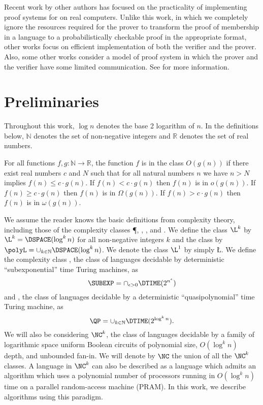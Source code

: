 \documentclass{article}
\begin{document}
Recent work by other authors has focused on the practicality of implementing proof systems for \NP{} on real computers.
Unlike this work, in which we completely ignore the resources required for the prover to transform the proof of membership in a language to a probabilistically checkable proof in the appropriate format, other works focus on efficient implementation of both the verifier and the prover.
Also, some other works consider a model of proof system in which the prover and the verifier have some limited communication.
See \autocites{bcgt13}{smbw12}{svpbbw12}{trmp12}{gkr08} for more information.

\section{Preliminaries}

Throughout this work, $\log n$ denotes the base 2 logarithm of $n$.
In the definitions below, $\mathbb{N}$ denotes the set of non-negative integers and $\mathbb{R}$ denotes the set of real numbers.

\begin{definition}
  For all functions $f, g \colon \mathbb{N} \to \mathbb{R}$, the function $f$ is in the class $O(g(n))$ if there exist real numbers $c$ and $N$ such that for all natural numbers $n$ we have $n > N$ implies $f(n) \leq c \cdot g(n)$.
  If $f(n) < c \cdot g(n)$ then $f(n)$ is in $o(g(n))$.
  If $f(n) \geq c \cdot g(n)$ then $f(n)$ is in $\Omega(g(n))$.
  If $f(n) > c \cdot g(n)$ then $f(n)$ is in $\omega(g(n))$.
\end{definition}

We assume the reader knows the basic definitions from complexity theory, including those of the complexity classes \P, \NP, \DTIME, and \DSPACE{}.
We define the class $\L^k$ by $\L^k = \DSPACE(\log^k n)$ for all non-negative integers $k$ and the class \polyL{} by $\polyL = \cup_{k \in \mathbb{N}} \DSPACE(\log^k n)$.
We denote the class $\L^1$ by simply \L.
We define the complexity class \SUBEXP{}, the class of languages decidable by deterministic ``subexponential'' time Turing machines, as
\begin{equation*}
  \SUBEXP = \cap_{\epsilon > 0} \DTIME(2^{n^\epsilon})
\end{equation*}
and \QP{}, the class of languages decidable by a deterministic ``quasipolynomial'' time Turing machine, as
\begin{equation*}
  \QP = \cup_{k \in \mathbb{N}} \DTIME(2^{\log^k n}).
\end{equation*}
We will also be considering $\NC^k$, the class of languages decidable by a family of logarithmic space uniform Boolean circuits of polynomial size, $O(\log^k n)$ depth, and unbounded fan-in.
We will denote by $\NC$ the union of all the $\NC^k$ classes.
A language in $\NC^k$ can also be described as a language which admits an algorithm which uses a polynomial number of processors running in $O(\log^k n)$ time on a parallel random-access machine (PRAM).
In this work, we describe \NC{} algorithms using this paradigm.
\end{document}
